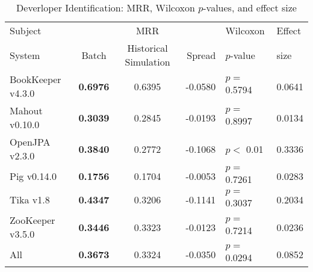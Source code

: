 \begin{table}[t]
\centering
\caption{Deverloper Identification: MRR, Wilcoxon $p$-values, and effect size}
\begin{tabular}{l|ccr|ll}
\toprule
Subject & & MRR & & Wilcoxon & Effect \\
System  &  Batch & Historical Simulation & Spread & $p$-value & size \\
\midrule
BookKeeper v4.3.0 & {\bf 0.6976 } & 0.6395 & -0.0580 & $p = $ 0.5794 & 0.0641 \\
Mahout v0.10.0 & {\bf 0.3039 } & 0.2845 & -0.0193 & $p = $ 0.8997 & 0.0134 \\
OpenJPA v2.3.0 & {\bf 0.3840 } & 0.2772 & -0.1068 & $p < $ 0.01 & 0.3336 \\
Pig v0.14.0 & {\bf 0.1756 } & 0.1704 & -0.0053 & $p = $ 0.7261 & 0.0283 \\
Tika v1.8 & {\bf 0.4347 } & 0.3206 & -0.1141 & $p = $ 0.3037 & 0.2034 \\
ZooKeeper v3.5.0 & {\bf 0.3446 } & 0.3323 & -0.0123 & $p = $ 0.7214 & 0.0236 \\
\midrule
All & {\bf 0.3673 } & 0.3324 & -0.0350 & $p = $ 0.0294 & 0.0852 \\
\bottomrule
\end{tabular}
\label{table:triage_rq2}
\end{table}
